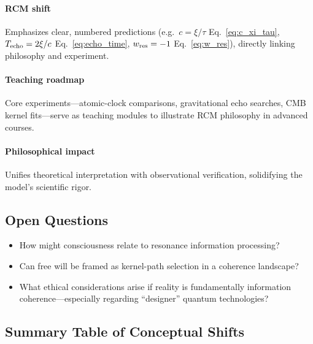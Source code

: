 \paragraph{RCM shift}  
Emphasizes clear, numbered predictions (e.g.\ \(c=\xi/\tau\) Eq.~\ref{eq:c_xi_tau}, \(T_{\rm echo}=2\xi/c\) Eq.~\ref{eq:echo_time}, \(w_{\rm res}=-1\) Eq.~\ref{eq:w_res}), directly linking philosophy and experiment.

\paragraph{Teaching roadmap}  
Core experiments—atomic-clock comparisons, gravitational echo searches, CMB kernel fits—serve as teaching modules to illustrate RCM philosophy in advanced courses.

\paragraph{Philosophical impact}  
Unifies theoretical interpretation with observational verification, solidifying the model's scientific rigor.

\subsection{Open Questions}

\begin{itemize}
  \item How might consciousness relate to resonance information processing?  
  \item Can free will be framed as kernel-path selection in a coherence landscape?  
  \item What ethical considerations arise if reality is fundamentally information coherence—especially regarding “designer” quantum technologies?  
\end{itemize}

\subsection{Summary Table of Conceptual Shifts}

